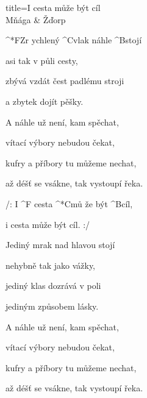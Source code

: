 \begin{song}{title=\predtitle\centering I cesta může být cíl \\\large Mňága \& Žďorp\vspace*{-0.3cm}}  %
\begin{centerjustified}
\nejnejvetsi

\sloka
	^*{F}Zr ychlený ^{C}vlak náhle ^{B}stojí
	
	asi tak v půli cesty,
   	
   	zbývá vzdát čest padlému stroji
   
   	a zbytek dojít pěšky.
   	
\sloka
	A náhle už není, kam spěchat,

	vítací výbory nebudou čekat,
   	
   	kufry a příbory tu můžeme nechat,
   
   	až déšť se vsákne, tak vystoupí řeka.
   	
	/: I ^{F \z}cesta ^*{C}mů že být ^{B}cíl,
	
	i cesta může být cíl. :/

\sloka
	Jediný mrak nad hlavou stojí
   
   	nehybně tak jako vážky,
   
   	jediný klas dozrává v poli
   
   	jediným způsobem lásky.
   	
\sloka 
	A náhle už není, kam spěchat,
   	
   	vítací výbory nebudou čekat,
   
   	kufry a příbory tu můžeme nechat,
   
   	až déšť se vsákne, tak vystoupí řeka.
   	


\end{centerjustified}
\setcounter{Slokočet}{0}
\end{song}
